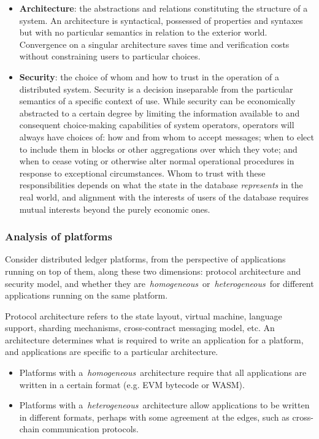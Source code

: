 \begin{itemize}
\tightlist
\item
  \textbf{Architecture}: the abstractions and relations constituting the
  structure of a system. An architecture is syntactical, possessed of
  properties and syntaxes but with no particular semantics in relation
  to the exterior world. Convergence on a singular architecture saves
  time and verification costs without constraining users to particular
  choices.
\item
  \textbf{Security}: the choice of whom and how to trust in the
  operation of a distributed system. Security is a decision inseparable
  from the particular semantics of a specific context of use. While
  security can be economically abstracted to a certain degree by
  limiting the information available to and consequent choice-making
  capabilities of system operators, operators will always have choices
  of: how and from whom to accept messages; when to elect to include
  them in blocks or other aggregations over which they vote; and when to
  cease voting or otherwise alter normal operational procedures in
  response to exceptional circumstances. Whom to trust with these
  responsibilities depends on what the state in the database
  \emph{represents} in the real world, and alignment with the interests
  of users of the database requires mutual interests beyond the purely
  economic ones.
\end{itemize}

\subsubsection{Analysis of platforms}\label{analysis-of-platforms}

Consider distributed ledger platforms, from the perspective of
applications running on top of them, along these two dimensions:
protocol architecture and security model, and whether they
are~\emph{homogeneous}~or~\emph{heterogeneous}~for different
applications running on the same platform.

Protocol architecture refers to the state layout, virtual machine,
language support, sharding mechanisms, cross-contract messaging model,
etc. An architecture determines what is required to write an application
for a platform, and applications are specific to a particular
architecture.

\begin{itemize}
\tightlist
\item
  Platforms with a~\emph{homogeneous}~architecture require that all
  applications are written in a certain format (e.g. EVM bytecode or
  WASM).
\item
  Platforms with a~\emph{heterogeneous}~architecture allow applications
  to be written in different formats, perhaps with some agreement at the
  edges, such as cross-chain communication protocols.
\end{itemize}

